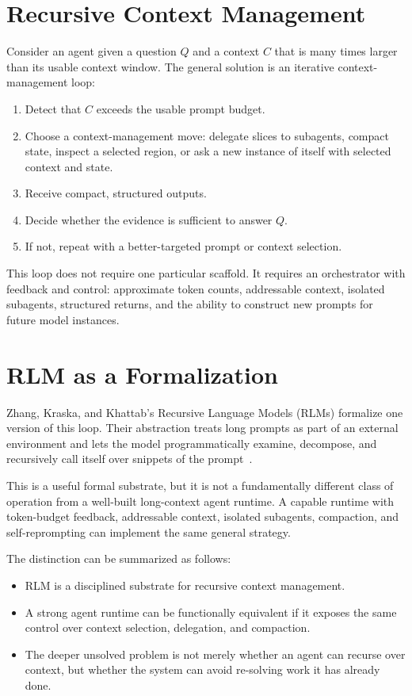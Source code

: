 \documentclass[11pt]{article}
\begin{document}
\section{Recursive Context Management}

Consider an agent given a question $Q$ and a context $C$ that is many times
larger than its usable context window. The general solution is an iterative
context-management loop:

\begin{enumerate}[leftmargin=*]
    \item Detect that $C$ exceeds the usable prompt budget.
    \item Choose a context-management move: delegate slices to subagents,
    compact state, inspect a selected region, or ask a new instance of itself
    with selected context and state.
    \item Receive compact, structured outputs.
    \item Decide whether the evidence is sufficient to answer $Q$.
    \item If not, repeat with a better-targeted prompt or context selection.
\end{enumerate}

This loop does not require one particular scaffold. It requires an
orchestrator with feedback and control: approximate token counts, addressable
context, isolated subagents, structured returns, and the ability to construct
new prompts for future model instances.

\section{RLM as a Formalization}

Zhang, Kraska, and Khattab's Recursive Language Models (RLMs) formalize one
version of this loop. Their abstraction treats long prompts as part of an
external environment and lets the model programmatically examine, decompose,
and recursively call itself over snippets of the prompt~\cite{zhang2026rlm}.

This is a useful formal substrate, but it is not a fundamentally different
class of operation from a well-built long-context agent runtime. A capable
runtime with token-budget feedback, addressable context, isolated subagents,
compaction, and self-reprompting can implement the same general strategy.

The distinction can be summarized as follows:

\begin{itemize}[leftmargin=*]
    \item RLM is a disciplined substrate for recursive context management.
    \item A strong agent runtime can be functionally equivalent if it exposes
    the same control over context selection, delegation, and compaction.
    \item The deeper unsolved problem is not merely whether an agent can
    recurse over context, but whether the system can avoid re-solving work it
    has already done.
\end{itemize}
\end{document}
